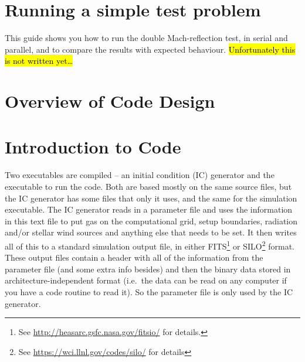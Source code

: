 \documentclass[a4paper,11pt]{report}
\begin{document}
\section{Running a simple test problem}
This guide shows you how to run the double Mach-reflection test, in serial and parallel, and to compare the results with expected behaviour.
\hl{Unfortunately this is not written yet\ldots}

\section{Overview of Code Design}


\section{Introduction to Code}
%

Two executables are compiled -- an initial condition (IC) generator and the executable to run the code.
Both are based mostly on the same source files, but the IC generator has some files that only it uses, and the same for the simulation executable.
The IC generator reads in a parameter file and uses the information in this text file to put gas on the computational grid, setup boundaries, radiation and/or stellar wind sources and anything else that needs to be set.
It then writes all of this to a standard simulation output file, in either FITS\footnote{See \url{http://heasarc.gsfc.nasa.gov/fitsio/} for details.} or SILO\footnote{See \url{https://wci.llnl.gov/codes/silo/} for details} format.
These output files contain a header with all of the information from the parameter file (and some extra info besides) and then the binary data stored in architecture-independent format (i.e.\ the data can be read on any computer if you have a code routine to read it).
So the parameter file is only used by the IC generator.
\end{document}
